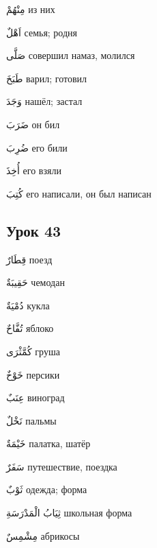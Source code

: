 \documentclass[a5paper]{article}
\newcommand\textstyleDropCaps[1]{#1}
\newcommand\textstyleCaptioncharacters[1]{#1}
\begin{document}
\textstyleCaptioncharacters{مِنْهُمْ }\textstyleDropCaps{из них‎}

\textstyleCaptioncharacters{اَهْلٌ }\textstyleDropCaps{семья; родня‎}

\textstyleCaptioncharacters{صَلَّى }\textstyleDropCaps{совершил намаз, мо­лился‎}

\textstyleCaptioncharacters{طَبَخَ }\textstyleDropCaps{варил; готовил‎}

\textstyleCaptioncharacters{وَجَدَ }\textstyleDropCaps{нашёл; застал‎}

\textstyleCaptioncharacters{ضَرَبَ }\textstyleDropCaps{он бил‎}

\textstyleCaptioncharacters{ضُرِبَ }\textstyleDropCaps{его били‎}

\textstyleCaptioncharacters{أُخِذَ }\textstyleDropCaps{его взяли‎}

\textstyleCaptioncharacters{كُتِبَ }\textstyleDropCaps{его написали, он был написан‎}

\subsection[Урок 43‎]{\textstyleDropCaps{Урок 43‎}}
\textstyleCaptioncharacters{قِطَارٌ }\textstyleDropCaps{поезд‎}

\textstyleCaptioncharacters{حَقِيبَةٌ }\textstyleDropCaps{чемодан‎}

\textstyleCaptioncharacters{دُمْيَةٌ }\textstyleDropCaps{кукла‎}

\textstyleCaptioncharacters{تُفَّاحٌ }\textstyleDropCaps{яблоко‎}

\textstyleCaptioncharacters{كُمَّثْرَى }\textstyleDropCaps{груша‎}

\textstyleCaptioncharacters{خَوْخٌ }\textstyleDropCaps{персики‎}

\textstyleCaptioncharacters{عِنَبٌ }\textstyleDropCaps{виноград‎}

\textstyleCaptioncharacters{نَخْلٌ }\textstyleDropCaps{пальмы‎}

\textstyleCaptioncharacters{خَيْمَةٌ }\textstyleDropCaps{палатка, шатёр‎}

\textstyleCaptioncharacters{سَفَرٌ }\textstyleDropCaps{путешествие, поезд­ка‎}

\textstyleCaptioncharacters{ثَوْبٌ }\textstyleDropCaps{одежда; форма‎}

\textstyleCaptioncharacters{ثِيَابُ الْمَدْرَسَةِ }\textstyleDropCaps{школь­ная форма‎}

\textstyleCaptioncharacters{مِشْمِسٌ }\textstyleDropCaps{абрикосы‎}
\end{document}
